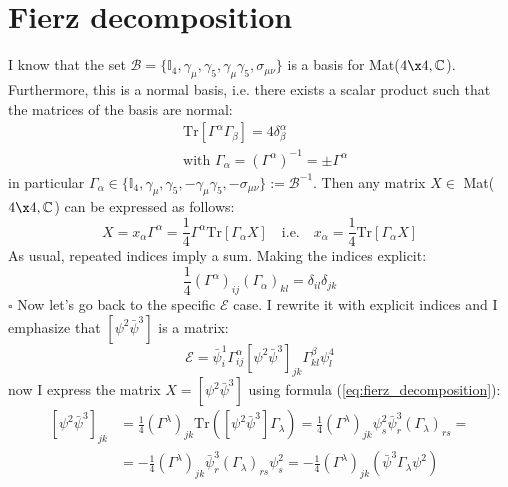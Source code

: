 \documentclass[english, LaM, oneside, noexaminfo]{sapthesis}
\begin{document}
\section{Fierz decomposition}
\noindent
I know that the set $\mathcal{B} = \{\mathbb{I}_4,\gamma_\mu, \gamma_5, \gamma_\mu\gamma_5, \sigma_{\mu\nu} \}$ is a basis for Mat($4 \x 4, \mathbb{C}$).
Furthermore, this is a normal basis, i.e. there exists a scalar product such that the matrices of the basis are normal:
\begin{equation*}
    \begin{aligned}
        &\text{Tr}\left[\Gamma^\alpha \Gamma_\beta\right] = 4 \delta^\alpha_\beta \\
        & \text{with } \Gamma_\alpha = (\Gamma^\alpha)^{-1} = \pm  \Gamma^\alpha
    \end{aligned}
\end{equation*}
in particular $\Gamma_\alpha \in \{\mathbb{I}_4,\gamma_\mu, \gamma_5, -\gamma_\mu\gamma_5, -\sigma_{\mu\nu} \} := \mathcal{B}^{-1}$.
Then any matrix $X \in$ Mat($4 \x 4, \mathbb{C}$) can be expressed as follows:
\begin{equation}\label{eq:fierz_decomposition}
    X = x_\alpha \Gamma^{\alpha} = \frac{1}{4} \Gamma^{\alpha} \text{Tr} \left[\Gamma_{\alpha} X\right] 
    \quad \text{i.e.} \quad x_\alpha = \frac{1}{4}\text{Tr} \left[\Gamma_{\alpha} X\right] 
\end{equation}
As usual, repeated indices imply a sum.
Making the indices explicit:
\begin{equation*}
    \frac{1}{4} \left(\Gamma^\alpha\right)_{ij} \left(\Gamma_\alpha\right)_{kl} = \delta_{il} \delta_{jk}
\end{equation*}
\hspace*{.97\textwidth} $\square$ \newline
Now let's go back to the specific $\mathcal{E}$ case.
I rewrite it with explicit indices and I emphasize that $\left[\psi^2 \bar\psi^3\right]$ is a matrix:
\begin{equation*}
    \mathcal{E} = \bar\psi^1_i \Gamma^\alpha_{ij} \left[\psi^2 \bar\psi^3\right]_{jk} \Gamma^\beta_{kl} \psi^4_l 
\end{equation*}
now I express the matrix $X = \left[\psi^2 \bar\psi^3\right]$ using formula (\ref{eq:fierz_decomposition}):
\begin{equation*}
    \begin{aligned}
        \left[\psi^2 \bar\psi^3\right]_{jk}
        & = \frac{1}{4} \left(\Gamma^\lambda\right)_{jk} \text{Tr}\left( \left[\psi^2 \bar\psi^3\right] \Gamma_\lambda\right) = \frac{1}{4} \left(\Gamma^\lambda\right)_{jk}  \psi^2_s \bar\psi^3_r  \left(\Gamma_\lambda\right)_{rs} = \\
        & = - \frac{1}{4} \left(\Gamma^\lambda\right)_{jk} \bar\psi^3_r  \left(\Gamma_\lambda\right)_{rs}  \psi^2_s = - \frac{1}{4} \left(\Gamma^\lambda\right)_{jk}  \left( \bar\psi^3 \Gamma_\lambda \psi^2\right) \\
    \end{aligned}
\end{equation*}
\end{document}
